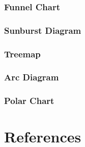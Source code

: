 \documentclass[
  letterpaper,
  DIV=11,
  numbers=noendperiod]{scrreprt}
\begin{document}
\subsection{Funnel Chart}\label{funnel-chart}

\subsection{Sunburst Diagram}\label{sunburst-diagram}

\subsection{Treemap}\label{treemap}

\subsection{Arc Diagram}\label{arc-diagram}

\subsection{Polar Chart}\label{polar-chart}


\chapter*{References}\label{references}

\end{document}
